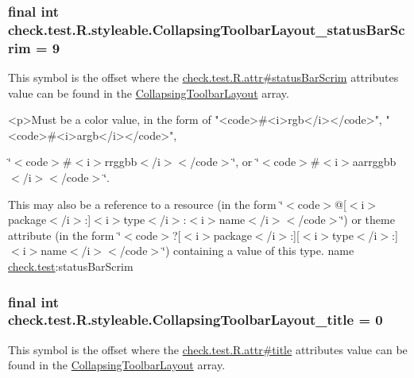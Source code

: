 \subsubsection[{Collapsing\+Toolbar\+Layout\+\_\+status\+Bar\+Scrim}]{\setlength{\rightskip}{0pt plus 5cm}final int check.\+test.\+R.\+styleable.\+Collapsing\+Toolbar\+Layout\+\_\+status\+Bar\+Scrim = 9\hspace{0.3cm}{\ttfamily [static]}}\label{classcheck_1_1test_1_1_r_1_1styleable_a2475ffb2f49d975dd9c976b973c3385f}
This symbol is the offset where the \hyperlink{classcheck_1_1test_1_1_r_1_1attr_a6c4449ac97eb2616059433f47cbaeb84}{check.\+test.\+R.\+attr\#status\+Bar\+Scrim} attribute\textquotesingle{}s value can be found in the \hyperlink{classcheck_1_1test_1_1_r_1_1styleable_a0c512120c75d0ddac20063034a72db17}{Collapsing\+Toolbar\+Layout} array.

\begin{DoxyVerb}      <p>Must be a color value, in the form of "<code>#<i>rgb</i></code>", "<code>#<i>argb</i></code>",
\end{DoxyVerb}
 \char`\"{}$<$code$>$\#$<$i$>$rrggbb$<$/i$>$$<$/code$>$\char`\"{}, or \char`\"{}$<$code$>$\#$<$i$>$aarrggbb$<$/i$>$$<$/code$>$\char`\"{}. 

This may also be a reference to a resource (in the form \char`\"{}$<$code$>$@\mbox{[}$<$i$>$package$<$/i$>$\+:\mbox{]}$<$i$>$type$<$/i$>$\+:$<$i$>$name$<$/i$>$$<$/code$>$\char`\"{}) or theme attribute (in the form \char`\"{}$<$code$>$?\mbox{[}$<$i$>$package$<$/i$>$\+:\mbox{]}\mbox{[}$<$i$>$type$<$/i$>$\+:\mbox{]}$<$i$>$name$<$/i$>$$<$/code$>$\char`\"{}) containing a value of this type.  name \hyperlink{namespacecheck_1_1test}{check.\+test}\+:status\+Bar\+Scrim \hypertarget{classcheck_1_1test_1_1_r_1_1styleable_af9921604bea0ce807ca10fd495eb7f48}{}
\subsubsection[{Collapsing\+Toolbar\+Layout\+\_\+title}]{\setlength{\rightskip}{0pt plus 5cm}final int check.\+test.\+R.\+styleable.\+Collapsing\+Toolbar\+Layout\+\_\+title = 0\hspace{0.3cm}{\ttfamily [static]}}\label{classcheck_1_1test_1_1_r_1_1styleable_af9921604bea0ce807ca10fd495eb7f48}
This symbol is the offset where the \hyperlink{classcheck_1_1test_1_1_r_1_1attr_a002c5907c5484ce9f870aa21ac099f9b}{check.\+test.\+R.\+attr\#title} attribute\textquotesingle{}s value can be found in the \hyperlink{classcheck_1_1test_1_1_r_1_1styleable_a0c512120c75d0ddac20063034a72db17}{Collapsing\+Toolbar\+Layout} array.

